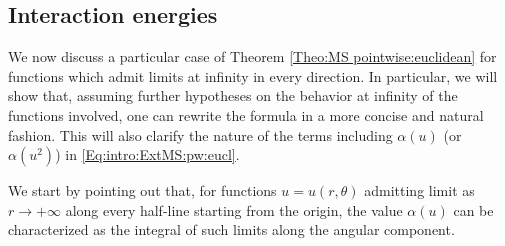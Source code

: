 \documentclass[reqno,11pt]{amsart}
\numberwithin{equation}{section}
\theoremstyle{definition} %
\newtheorem{example}{Example}[section]
\theoremstyle{plain}
\theoremstyle{definition}
\theoremstyle{remark}
\def\io{\int_\Omega}
\def\semin#1#2{ [#1 ]_{#2}}
\def\R{\mathbb{R}}
\begin{document}


\subsection{Interaction energies}
We now discuss a particular case of Theorem \ref{Theo:MS pointwise:euclidean} for functions which admit limits at infinity in every direction.
In particular, we will show that, assuming further hypotheses on the behavior at infinity of the functions involved, one can rewrite the formula in a more concise and natural fashion. This will also clarify the nature of the terms including $\alpha(u)$ (or $\alpha(u^2)$) in \eqref{Eq:intro:ExtMS:pw:eucl}.

We start by pointing out that, for functions $u=u(r,\theta)$ admitting limit as $r\to+\infty$ along every half-line starting from the origin, the value $\alpha(u)$ can be characterized as the integral of such limits along the angular component.
\end{document}
